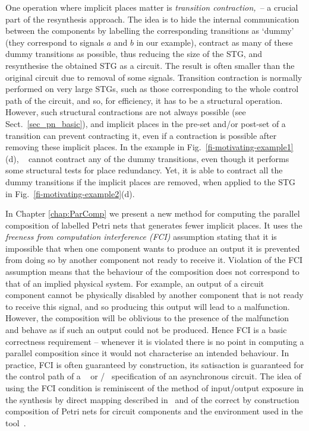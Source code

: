 One operation where implicit places matter is \emph{transition contraction,}~\cite{vowo02lncs}-- a crucial part of the resynthesis approach. The idea is to hide the internal communication between the components by labelling the corresponding transitions as `dummy' (they correspond to signals $a$ and $b$ in our example), contract as many of these dummy transitions as possible, thus reducing the size of the STG, and resynthesise the obtained STG as a circuit. The result is often smaller than the original circuit due to removal of some signals. Transition contraction is normally performed on very large STGs, such as those corresponding to the whole control path of the circuit, and so, for efficiency, it has to be a structural operation. However, such structural contractions are not always possible (see Sect.~\ref{sec_pn_basic}), and implicit places in the pre-set and/or post-set of a transition can prevent contracting it, even if a contraction is possible after removing these implicit places. In the example in Fig.~\ref{fi-motivating-example1}(d), \desij~\cite{DesiJ} cannot contract any of the dummy transitions, even though it performs some structural tests for place redundancy. Yet, it is able to contract all the dummy transitions if the implicit places are removed, \ie when applied to the STG in Fig.~\ref{fi-motivating-example2}(d).

In Chapter \ref{chap:ParComp} we present a new method for computing the parallel composition of labelled Petri nets that generates fewer implicit places. It uses the \emph{freeness from computation interference (FCI)} assumption \cite{eber92} stating that it is impossible that when one component wants to produce an output it is prevented from doing so by another component not ready to receive it. Violation of the FCI assumption means that the behaviour of the composition does not correspond to that of an implied physical system. For example, an output of a circuit component cannot be physically disabled by another component that is not ready to receive this signal, and so producing this output will lead to a malfunction. However, the composition will be oblivious to the presence of the malfunction and behave as if such an output could not be produced.
Hence FCI is a basic correctness requirement -- whenever it is violated there is no point in computing a parallel composition since it would not characterise an intended behaviour. In practice, FCI is often guaranteed by construction, \eg its satisaction is guaranteed for the control path of a \balsa~\cite{EB-02} or \haste/\tangram~\cite{berkel91,haste-manual} specification of an asynchronous circuit. The idea of using the FCI condition is reminiscent of the method of input/output exposure in the synthesis by direct mapping described in~\cite{SBY-07} and of the correct by construction composition of Petri nets for circuit components and the environment used in the \ditopn tool~\cite{JF-00}.

